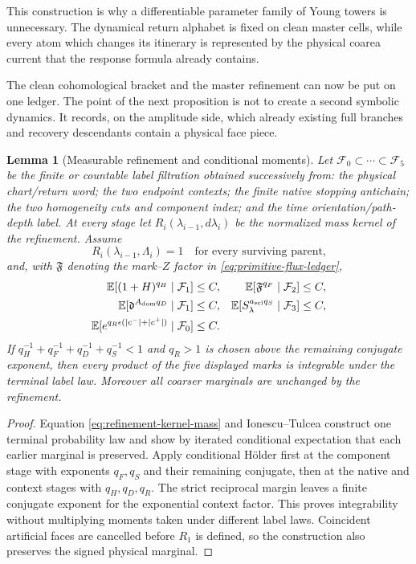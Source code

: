 \documentclass[11pt]{article}
\newtheorem{lemma}[theorem]{Lemma}
\begin{document}
This construction is why a differentiable parameter family of Young towers
is unnecessary.  The dynamical return alphabet is fixed on clean master
cells, while every atom which changes its itinerary is represented by the
physical coarea current that the response formula already contains.

The clean cohomological bracket and the master refinement can now be put on one ledger.  The
point of the next proposition is not to create a second symbolic dynamics.
It records, on the amplitude side, which already existing full branches and
recovery descendants contain a physical face piece.

\begin{lemma}[Measurable refinement and conditional moments]
\label{lem:measurable-refinement-moments}
Let $\mathcal F_0\subset\cdots\subset\mathcal F_5$ be the finite or countable
label filtration obtained successively from: the physical chart/return word;
the two endpoint contexts; the finite native stopping antichain; the two
homogeneity cuts and component index; and the time orientation/path-depth
label.  At every stage let $R_i(\lambda_{i-1},d\lambda_i)$ be the normalized
mass kernel of the refinement.  Assume
\begin{equation}
\label{eq:refinement-kernel-mass}
 R_i(\lambda_{i-1},\Lambda_i)=1
 \quad\text{for every surviving parent,}
\end{equation}
and, with $\mathfrak F$ denoting the mark--$Z$ factor in
\eqref{eq:primitive-flux-ledger},
\begin{align}
 \mathbb E[(1+H)^{q_H}\mid\mathcal F_1]&\le C,&
 \mathbb E[\mathfrak F^{q_F}\mid\mathcal F_2]&\le C,
 \label{eq:conditional-refinement-moments}\\
 \mathbb E[\mathfrak d^{A_{\rm dom}q_D}\mid\mathcal F_1]&\le C,&
 \mathbb E[S_\lambda^{a_{\rm scl}q_S}\mid\mathcal F_3]&\le C,
 \notag\\
 \mathbb E[e^{q_R\epsilon(|c^-|+|c^+|)}\mid\mathcal F_0]&\le C.&&
 \notag
\end{align}
If $q_H^{-1}+q_F^{-1}+q_D^{-1}+q_S^{-1}<1$ and $q_R>1$ is chosen above the remaining
conjugate exponent, then every product of the five displayed marks is
integrable under the terminal label law.  Moreover all coarser marginals are
unchanged by the refinement.
\end{lemma}

\begin{proof}
Equation \eqref{eq:refinement-kernel-mass} and Ionescu--Tulcea construct one
terminal probability law and show by iterated conditional expectation that
each earlier marginal is preserved.  Apply conditional H\"older first at the
component stage with exponents $q_F,q_S$ and their remaining conjugate, then at the native and
context stages with $q_H,q_D,q_R$.  The strict reciprocal margin leaves a
finite conjugate exponent for the exponential context factor.  This proves
integrability without multiplying moments taken under different label laws.
Coincident artificial faces are cancelled before $R_1$ is defined, so the
construction also preserves the signed physical marginal.
\end{proof}
\end{document}
